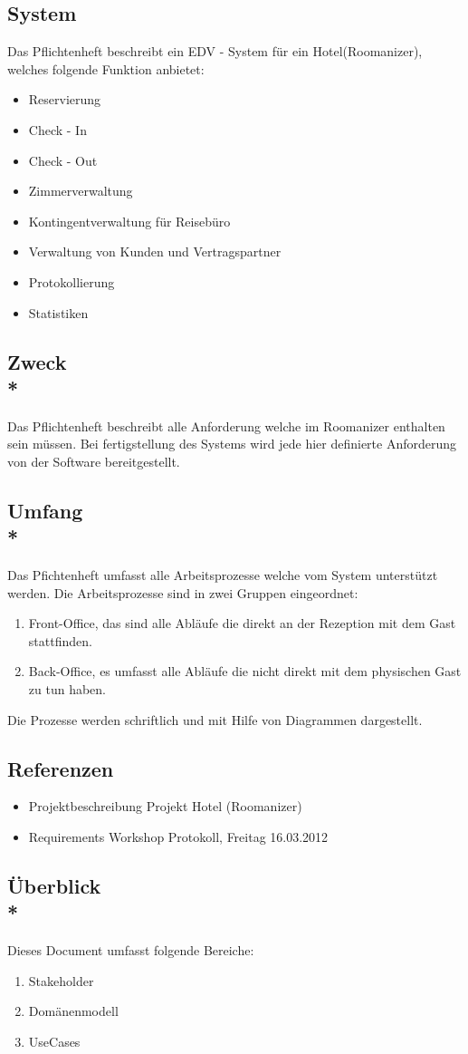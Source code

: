 \subsection{System}
Das Pflichtenheft beschreibt ein EDV - System für ein Hotel(Roomanizer), welches 
folgende Funktion anbietet:
\begin{itemize}
	\item Reservierung
	\item Check - In
	\item Check - Out
	\item Zimmerverwaltung
	\item Kontingentverwaltung für Reisebüro
	\item Verwaltung von Kunden und Vertragspartner
	\item Protokollierung
	\item Statistiken
\end{itemize}

\subsection{Zweck\\*}
 Das Pflichtenheft beschreibt alle Anforderung welche im Roomanizer enthalten sein müssen. Bei fertigstellung des Systems wird jede hier definierte Anforderung von der Software bereitgestellt.

\subsection{Umfang\\*}
Das Pfichtenheft umfasst alle Arbeitsprozesse welche vom System unterstützt werden. 
Die Arbeitsprozesse sind in zwei Gruppen eingeordnet:
\begin{enumerate}
\item Front-Office, das sind alle Abläufe die direkt an der Rezeption mit dem Gast stattfinden.
\item Back-Office, es umfasst alle Abläufe die nicht direkt mit dem physischen Gast zu tun haben.
\end{enumerate}
Die Prozesse werden schriftlich und mit Hilfe von Diagrammen dargestellt.

\subsection{Referenzen}
\begin{itemize}
\item Projektbeschreibung Projekt Hotel (Roomanizer) 
\item Requirements Workshop Protokoll, Freitag 16.03.2012
\end{itemize}

\subsection{Überblick\\*}
Dieses Document umfasst folgende Bereiche:
\begin{enumerate}
\item Stakeholder
\item Domänenmodell
\item UseCases 
\end{enumerate}

